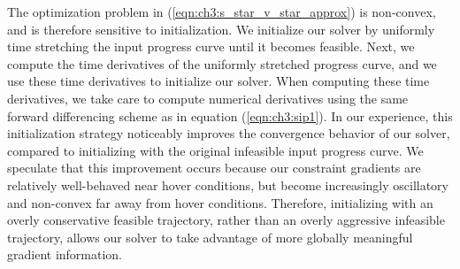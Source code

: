 The optimization problem in (\ref{eqn:ch3:s_star_v_star_approx}) is non-convex, and is therefore sensitive to initialization.
We initialize our solver by uniformly time stretching the input progress curve until it becomes feasible.
Next, we compute the time derivatives of the uniformly stretched progress curve, and we use these time derivatives to initialize our solver.
When computing these time derivatives, we take care to compute numerical derivatives using the same forward differencing scheme as in equation (\ref{eqn:ch3:sip1}).
In our experience, this initialization strategy noticeably improves the convergence behavior of our solver, compared to initializing with the original infeasible input progress curve.
We speculate that this improvement occurs because our constraint gradients are relatively well-behaved near hover conditions, but become increasingly oscillatory and non-convex far away from hover conditions.
Therefore, initializing with an overly conservative feasible trajectory, rather than an overly aggressive infeasible trajectory, allows our solver to take advantage of more globally meaningful gradient information.

